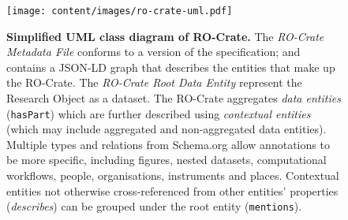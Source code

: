 
\begin{figure}[t!]
    \centering
    \texttt{[image: content/images/ro-crate-uml.pdf]}
    \caption{\textbf{Simplified UML class diagram of RO-Crate.} The \emph{RO-Crate Metadata File} conforms to a version of the specification; and contains a JSON-LD graph \cite{sporny_2014} that describes the entities that make up the RO-Crate. The \emph{RO-Crate Root Data Entity} represent the Research Object as a dataset. The RO-Crate aggregates \emph{data entities} (\texttt{hasPart}) which are further described using \emph{contextual entities} (which may include aggregated and non-aggregated data entities). Multiple types and relations from Schema.org allow annotations to be more specific, including figures, nested datasets, computational workflows, people, organisations, instruments and places. Contextual entities not otherwise cross-referenced from other entities' properties (\emph{describes}) can be grouped under the root entity (\texttt{mentions}).}
    \label{fig:uml}
\end{figure}
